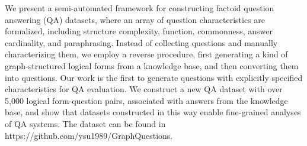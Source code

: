 We present a semi-automated framework for constructing factoid question answering (QA) datasets, where an array of question characteristics are formalized, including structure complexity, function, commonness, answer cardinality, and paraphrasing. Instead of collecting questions and manually characterizing them, we employ a reverse procedure, first generating a kind of graph-structured logical forms from a knowledge base, and then converting them into questions. Our work is the first to generate questions with explicitly specified characteristics for QA evaluation. We construct a new QA dataset with over 5,000 logical form-question pairs, associated with answers from the knowledge base, and show that datasets constructed in this way enable fine-grained analyses of QA systems. The dataset can be found in https://github.com/ysu1989/GraphQuestions.
